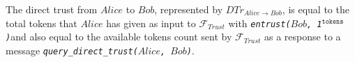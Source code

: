 \begin{definition}
  The direct trust from $Alice$ to $Bob$, represented by $DTr_{Alice \rightarrow Bob}$, is equal to the total tokens that
  $Alice$ has given as input to $\mathcal{F}_{Trust}$ with \emph{\texttt{entrust(}$Bob$\texttt{,
  1}$^{\texttt{tokens}}$\texttt{)}}and also equal to the available tokens count sent by $\mathcal{F}_{Trust}$ as a response to
  a message \emph{\texttt{query\_direct\_trust(}$Alice$\texttt{, }$Bob$\texttt{)}}.
\end{definition}

